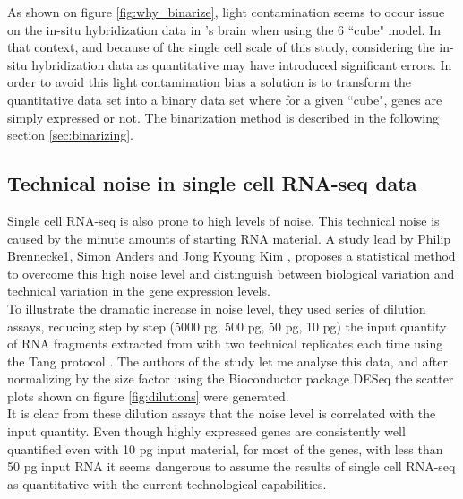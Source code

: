   As shown on figure \ref{fig:why_binarize}, light contamination seems to occur issue on the in-situ hybridization data in \platy{}'s brain when using the 6  ``cube" model. In that context, and because of the single cell scale of this study, considering the in-situ hybridization data as quantitative may have introduced significant errors. In order to avoid this light contamination bias a solution is to transform the quantitative data set into a binary data set where for a given ``cube", genes are simply expressed or not. The binarization method is described in the following section \ref{sec:binarizing}.
  


  \subsection{Technical noise in single cell RNA-seq data}
  Single cell RNA-seq is also prone to high levels of noise. This technical noise is caused by the minute amounts of starting RNA material. A study lead by Philip Brennecke1, Simon Anders and Jong Kyoung Kim \cite{brennecke13}, proposes a statistical method to overcome this high noise level and distinguish between biological variation and technical variation in the gene expression levels.\\
  
  To illustrate the dramatic increase in noise level, they used series of dilution assays, reducing step by step (5000 pg, 500 pg, 50 pg, 10 pg) the input quantity of RNA fragments extracted from  with two technical replicates each time using the Tang protocol \cite{tang09}. The authors of the study let me analyse this data, and after normalizing by the size factor using the Bioconductor package DESeq \cite{anders10} the scatter plots shown on figure \ref{fig:dilutions} were generated. \\
  
  It is clear from these dilution assays that the noise level is correlated with the input quantity. Even though highly expressed genes are consistently well quantified even with 10 pg input material, for most of the genes, with less than 50 pg input RNA it seems dangerous to assume the results of single cell RNA-seq as quantitative with the current technological capabilities.
  
